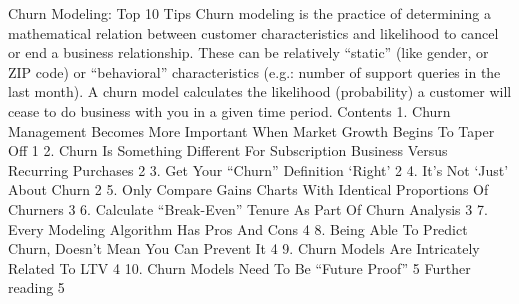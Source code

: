Churn Modeling: Top 10 Tips
Churn modeling is the practice of determining a mathematical relation between customer characteristics and likelihood to cancel or end a business relationship. These can be relatively “static” (like gender, or ZIP code) or “behavioral” characteristics (e.g.: number of support queries in the last month). A churn model calculates the likelihood (probability) a customer will cease to do business with you in a given time period.
Contents
1. Churn Management Becomes More Important When Market Growth Begins To Taper Off	1
2. Churn Is Something Different For Subscription Business Versus Recurring Purchases	2
3. Get Your “Churn” Definition ‘Right’	2
4. It’s Not ‘Just’ About Churn	2
5. Only Compare Gains Charts With Identical Proportions Of Churners	3
6. Calculate “Break-Even” Tenure As Part Of Churn Analysis	3
7. Every Modeling Algorithm Has Pros And Cons	4
8. Being Able To Predict Churn, Doesn’t Mean You Can Prevent It	4
9. Churn Models Are Intricately Related To LTV	4
10. Churn Models Need To Be “Future Proof”	5
Further reading	5


